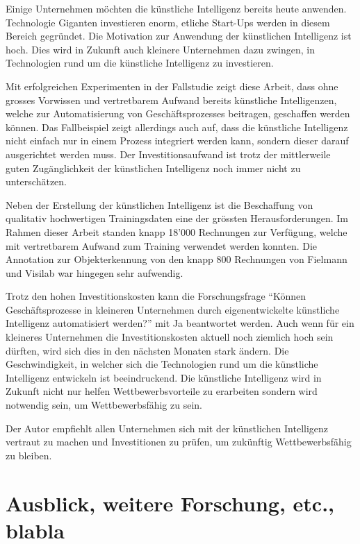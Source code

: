Einige Unternehmen möchten die künstliche Intelligenz bereits heute anwenden. Technologie Giganten investieren enorm, etliche Start-Ups werden in diesem Bereich gegründet. Die Motivation zur Anwendung der künstlichen Intelligenz ist hoch. Dies wird in Zukunft auch kleinere Unternehmen dazu zwingen, in Technologien rund um die künstliche Intelligenz zu investieren.

Mit erfolgreichen Experimenten in der Fallstudie zeigt diese Arbeit, dass ohne grosses Vorwissen und vertretbarem Aufwand bereits künstliche Intelligenzen, welche zur Automatisierung von Geschäftsprozesses beitragen, geschaffen werden können. Das Fallbeispiel zeigt allerdings auch auf, dass die künstliche Intelligenz nicht einfach nur in einem Prozess integriert werden kann, sondern dieser darauf ausgerichtet werden muss. Der Investitionsaufwand ist trotz der mittlerweile guten Zugänglichkeit der künstlichen Intelligenz noch immer nicht zu unterschätzen.

Neben der Erstellung der künstlichen Intelligenz ist die Beschaffung von qualitativ hochwertigen Trainingsdaten eine der grössten Herausforderungen. Im Rahmen dieser Arbeit standen knapp 18'000 Rechnungen zur Verfügung, welche mit vertretbarem Aufwand zum Training verwendet werden konnten. Die Annotation zur Objekterkennung von den knapp 800 Rechnungen von Fielmann und Visilab war hingegen sehr aufwendig. 

Trotz den hohen Investitionskosten kann die Forschungsfrage \enquote{Können Geschäftsprozesse in kleineren Unternehmen durch eigenentwickelte künstliche Intelligenz automatisiert werden?} mit Ja beantwortet werden. Auch wenn für ein kleineres Unternehmen die Investitionskosten aktuell noch ziemlich hoch sein dürften, wird sich dies in den nächsten Monaten stark ändern. Die Geschwindigkeit, in welcher sich die Technologien rund um die künstliche Intelligenz entwickeln ist beeindruckend. Die künstliche Intelligenz wird in Zukunft nicht nur helfen Wettbewerbsvorteile zu erarbeiten sondern wird notwendig sein, um Wettbewerbsfähig zu sein.

Der Autor empfiehlt allen Unternehmen sich mit der künstlichen Intelligenz vertraut zu machen und Investitionen zu prüfen, um zukünftig Wettbewerbsfähig zu bleiben. 

\cleardoublepage
\section{Ausblick, weitere Forschung, etc., blabla}

